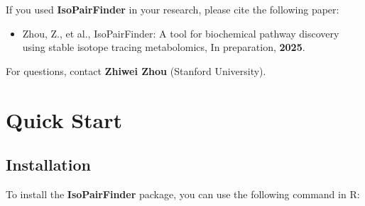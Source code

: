 \documentclass[
  letterpaper,
  DIV=11,
  numbers=noendperiod]{scrreprt}
\providecommand{\tightlist}{%
  \setlength{\itemsep}{0pt}\setlength{\parskip}{0pt}}
\begin{document}
If you used \textbf{IsoPairFinder} in your research, please cite the
following paper:

\begin{itemize}
\tightlist
\item
  Zhou, Z., et al., IsoPairFinder: A tool for biochemical pathway
  discovery using stable isotope tracing metabolomics, In preparation,
  \textbf{2025}.
\end{itemize}

For questions, contact \textbf{Zhiwei Zhou} (Stanford University).


\chapter{Quick Start}\label{sec-quick-start}

\section{Installation}\label{installation}

To install the \textbf{IsoPairFinder} package, you can use the following
command in R:
\end{document}
